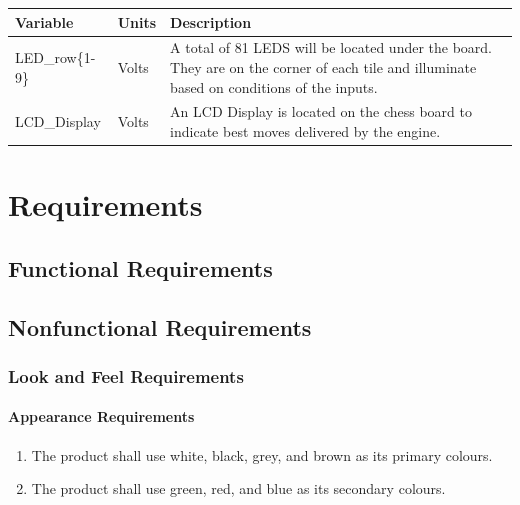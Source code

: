 \documentclass[12pt]{article}
\begin{document}
\begin{table}[H]
  \centering
      \setlength{\leftmargini}{0.4cm}
      \begin{tabular}{| >{\centering\arraybackslash}m{3cm} | 
        >{\centering\arraybackslash}m{2cm} | 
        >{\centering\arraybackslash}m{9cm} |}
      \hline
      \rowcolor[gray]{0.9}
      Variable & Units & Description\\
      \hline 
      LED\_row\{1-9\} & Volts & A total of 81 LEDS will be located under the board. They 
      are on the corner of each tile and illuminate based on conditions of the inputs. \\
      \hline 
      LCD\_Display & Volts & An LCD Display is located on the chess board to indicate
      best moves delivered by the engine. \\
      \hline 
      \end{tabular}
  \label{Table}
  \end{table}

\section{Requirements}
\subsection{Functional Requirements}
\subsection{Nonfunctional Requirements}

\setcounter{vnvSectionNfr}{1}

\setcounter{nfrNum}{1}

\subsubsection{Look and Feel Requirements}
\label{NFR_LF}
\paragraph{Appearance Requirements}
\begin{enumerate}[{LF}1., leftmargin=2\parindent]
    \item The product shall use white, black, grey, and brown as its primary colours.
    \item The product shall use green, red, and blue as its secondary colours.
\end{enumerate}
\end{document}
